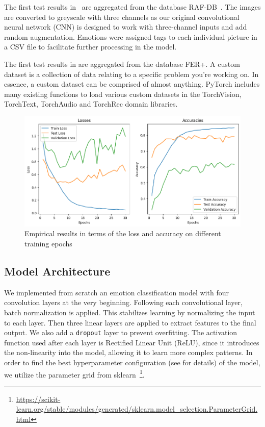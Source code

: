 The first test results in~ are aggregated from the database RAF-DB~\cite{li2019reliable}. 
The images are converted to greyscale with three channels as our original convolutional neural network (CNN) is designed to work with three-channel inputs and add random augmentation. 
Emotions were assigned tags to each individual picture in a CSV file to facilitate further processing in the model.

The first test results in  are aggregated from the database FER+. %
A custom dataset is a collection of data relating to a specific problem you're working on.
In essence, a custom dataset can be comprised of almost anything.
PyTorch includes many existing functions to load various custom datasets in the TorchVision, TorchText, TorchAudio and TorchRec domain libraries.


\begin{figure}[ht]
  \centering
   \includegraphics[width=\linewidth]{output.png}
   \caption{Empirical results in terms of the loss and accuracy on different training epochs}
   \label{fig:result}
\end{figure}

\subsection{Model Architecture}
We implemented from scratch an emotion classification model with four convolution layers at the very beginning. 
Following each convolutional layer, 
batch normalization is applied. 
This stabilizes learning by normalizing the input to each layer. 
Then three linear layers are applied to extract features to the final output. 
We also add a \texttt{dropout} layer to prevent overfitting. 
The activation function used after each layer is Rectified Linear Unit (ReLU), 
since it introduces the non-linearity into the model, 
allowing it to learn more complex patterns. 
In order to find the best hyperparameter configuration (see  for details) of the model, 
we utilize the parameter grid from sklearn~\footnote{\url{https://scikit-learn.org/stable/modules/generated/sklearn.model_selection.ParameterGrid.html}}. 

